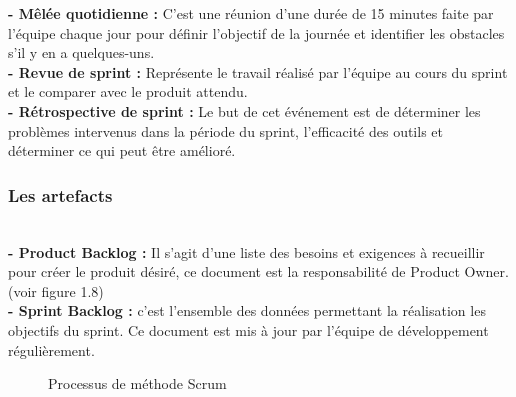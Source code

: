 \noindent \textbf{\LARGE - Mêlée quotidienne : }\textsf{\selectfont{} C'est une réunion d'une durée de 15 minutes faite par l’équipe chaque jour pour définir l’objectif de la journée et identifier les obstacles s’il y en a quelques-uns.}\\[0.1cm]

\noindent \textbf{\LARGE - Revue de sprint : } \textsf{\selectfont{} Représente le travail réalisé par l’équipe au cours du sprint et le comparer avec le produit attendu.}\\[0.1cm]

\noindent \textbf{\LARGE - Rétrospective de sprint : }\textsf{\selectfont{} Le but de cet événement est de déterminer les problèmes intervenus dans la période du sprint, l’efficacité des outils et déterminer ce qui peut être amélioré.}\\[0.1cm]

\subsubsection{ \Large Les artefacts}
\texttt{}\\[0.1cm]
\noindent \textbf{\LARGE - Product Backlog : }\textsf{
    \selectfont{} Il s’agit d’une liste des besoins et exigences à recueillir pour créer le produit désiré, ce document est la responsabilité de Product Owner.(voir figure 1.8)}\\[0.1cm]

\noindent \textbf{\LARGE - Sprint Backlog : }\textsf{\selectfont{} c’est l’ensemble des données permettant la réalisation les objectifs du sprint. Ce document est mis à jour par l’équipe de développement régulièrement.}
\texttt{}
\begin{figure}[H]
    \begin{center}
    \end{center}
    \caption{Processus de méthode Scrum}
\end{figure}

